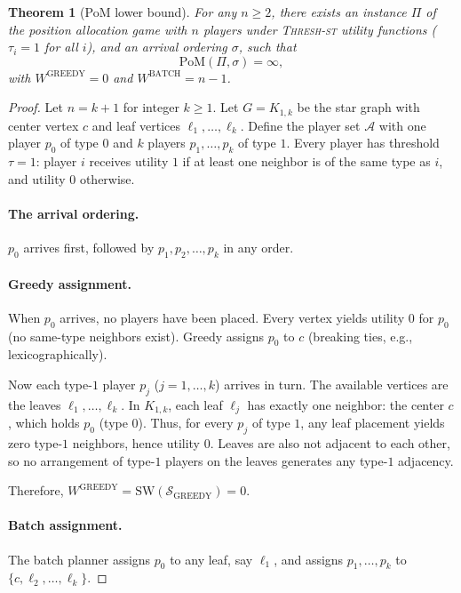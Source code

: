\documentclass[11pt]{article}
\newtheorem{theorem}{Theorem}
\newcommand{\SW}{\mathrm{SW}}
\newcommand{\GREEDY}{\mathrm{GREEDY}}
\newcommand{\BATCH}{\mathrm{BATCH}}
\newcommand{\PoM}{\mathrm{PoM}}
\newcommand{\A}{\mathcal{A}}
\begin{document}
\begin{theorem}[PoM lower bound]
  \label{thm:pom-lower-bound}
  For any $n \geq 2$, there exists an instance $\Pi$ of the position allocation game
  with $n$ players under \textup{\textsc{Thresh-st}} utility functions ($\tau_i = 1$
  for all $i$), and an arrival ordering $\sigma$, such that
  \begin{equation}
    \PoM(\Pi, \sigma) = \infty,
  \end{equation}
  with $W^{\GREEDY} = 0$ and $W^{\BATCH} = n - 1$.
\end{theorem}

\begin{proof}
  Let $n = k + 1$ for integer $k \geq 1$.
  Let $G = K_{1,k}$ be the star graph with center vertex $c$ and leaf vertices
  $\ell_1, \ldots, \ell_k$.
  Define the player set $\A$ with one player $p_0$ of type $0$ and $k$ players
  $p_1, \ldots, p_k$ of type $1$.
  Every player has threshold $\tau = 1$: player $i$ receives utility $1$ if at least
  one neighbor is of the same type as $i$, and utility $0$ otherwise.

  \paragraph{The arrival ordering.}
  $p_0$ arrives first, followed by $p_1, p_2, \ldots, p_k$ in any order.

  \paragraph{Greedy assignment.}
  When $p_0$ arrives, no players have been placed.
  Every vertex yields utility $0$ for $p_0$ (no same-type neighbors exist).
  Greedy assigns $p_0$ to $c$ (breaking ties, e.g., lexicographically).

  Now each type-$1$ player $p_j$ ($j = 1, \ldots, k$) arrives in turn.
  The available vertices are the leaves $\ell_1, \ldots, \ell_k$.
  In $K_{1,k}$, each leaf $\ell_j$ has exactly one neighbor: the center $c$, which
  holds $p_0$ (type $0$).
  Thus, for every $p_j$ of type $1$, any leaf placement yields zero type-$1$
  neighbors, hence utility $0$.
  Leaves are also not adjacent to each other, so no arrangement of type-$1$ players
  on the leaves generates any type-$1$ adjacency.

  Therefore, $W^{\GREEDY} = \SW(\mathcal{S}_{\GREEDY}) = 0$.

  \paragraph{Batch assignment.}
  The batch planner assigns $p_0$ to any leaf, say $\ell_1$, and assigns
  $p_1, \ldots, p_k$ to $\{c, \ell_2, \ldots, \ell_k\}$.


\end{proof}
\end{document}
